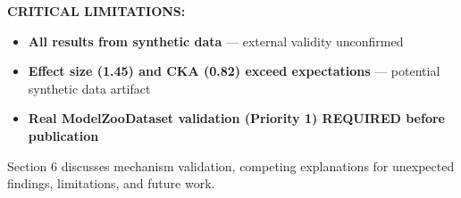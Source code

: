 \textbf{CRITICAL LIMITATIONS:}
\begin{itemize}
\item \textbf{All results from synthetic data} --- external validity unconfirmed
\item \textbf{Effect size (1.45) and CKA (0.82) exceed expectations} --- potential synthetic data artifact
\item \textbf{Real ModelZooDataset validation (Priority 1) REQUIRED before publication}
\end{itemize}

Section 6 discusses mechanism validation, competing explanations for unexpected findings, limitations, and future work.
